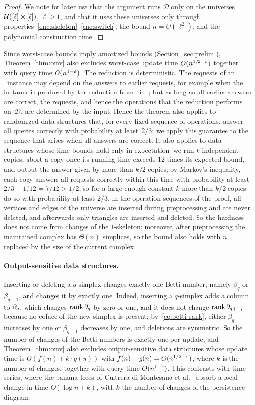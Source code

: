 \begin{proof}
We note for later use that the argument runs $\mathcal{D}$ only on the universes $\mathcal{U}([\ell]\times[\ell])$, $\ell\ge1$, and that it uses these universes only through properties~\ref{enc:skeleton}--\ref{enc:switch}, the bound $n=O(\ell^2)$, and the polynomial construction time.
\end{proof}

Since worst-case bounds imply amortized bounds (Section~\ref{sec:prelim}), Theorem~\ref{thm:omv} also excludes worst-case update time $O(n^{1/2-\varepsilon})$ together with query time $O(n^{1-\varepsilon})$.
The reduction is deterministic.
The requests of an \OuMv\ instance may depend on the answers to earlier requests, for example when the instance is produced by the reduction from \OMv\ in~\cite{HKNS15full}; but as long as all earlier answers are correct, the requests, and hence the operations that the reduction performs on~$\mathcal{D}$, are determined by the input.
Hence the theorem also applies to randomized data structures that, for every fixed sequence of operations, answer all queries correctly with probability at least~$2/3$: we apply this guarantee to the sequence that arises when all answers are correct.
It also applies to data structures whose time bounds hold only in expectation: we run $k$ independent copies, abort a copy once its running time exceeds $12$ times its expected bound, and output the answer given by more than $k/2$ copies; by Markov's inequality, each copy answers all requests correctly within this time with probability at least $2/3-1/12=7/12>1/2$, so for a large enough constant $k$ more than $k/2$ copies do so with probability at least $2/3$.
In the operation sequences of the proof, all vertices and edges of the universe are inserted during preprocessing and are never deleted, and afterwards only triangles are inserted and deleted.
So the hardness does not come from changes of the $1$-skeleton; moreover, after preprocessing the maintained complex has $\Theta(n)$ simplices, so the bound also holds with $n$ replaced by the size of the current complex.

\paragraph{Output-sensitive data structures.}
Inserting or deleting a $q$-simplex changes exactly one Betti number, namely $\beta_q$ or $\beta_{q-1}$, and changes it by exactly one.
Indeed, inserting a $q$-simplex adds a column to $\partial_q$, which changes $\operatorname{rank}\partial_q$ by zero or one, and it does not change $\operatorname{rank}\partial_{q+1}$, because no coface of the new simplex is present; by~\eqref{eq:betti-rank}, either $\beta_q$ increases by one or $\beta_{q-1}$ decreases by one, and deletions are symmetric.
So the number of changes of the Betti numbers is exactly one per update, and Theorem~\ref{thm:omv} also excludes output-sensitive data structures whose update time is $O(f(n)+k\cdot g(n))$ with $f(n)+g(n)=O(n^{1/2-\varepsilon})$, where $k$ is the number of changes, together with query time $O(n^{1-\varepsilon})$.
This contrasts with time series, where the banana trees of Cultrera di Montesano et al.~\cite{CEHO24} absorb a local change in time $O(\log n+k)$, with $k$ the number of changes of the persistence diagram.


